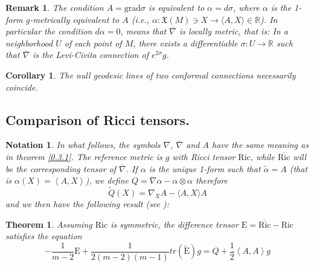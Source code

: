\documentclass{amsart}%
\newtheorem{theorem}{Theorem}
\theoremstyle{plain}
\newtheorem{corollary}{Corollary}
\newtheorem{notation}{Notation}
\newtheorem{remark}{Remark}
\numberwithin{equation}{section}
\begin{document}
\begin{remark}
\label{0.3.2}The condition $A=\mathrm{grad}\sigma$ is equivalent to
$\alpha=d\sigma$, where $\alpha$ is the 1-form $g$-metrically equivalent to
$A$ (i.e., $\alpha:\mathfrak{X}(M)\ni X\longrightarrow\langle A,X\rangle
\in\mathbb{R}$). In particular the condition $d\alpha=0$, means that
$\overline{\nabla}$ is locally metric, that is: In a neighborhood $U$ of each
point of $M$, there exists a differentiable $\sigma:U\longrightarrow
\mathbb{R}$ such that $\overline{\nabla}$ is the Levi-Civita connection of
$e^{2\sigma}g$.
\end{remark}

\begin{corollary}
The null geodesic lines of two conformal connections necessarily coincide.
\end{corollary}

\subsection{Comparison of Ricci tensors.}

\begin{notation}
\label{notacion}In what follows, the symbols $\nabla$, $\overline{\nabla}$ and
$A$ have the same meaning as in theorem \ref{0.3.1}. The reference metric is
$g$ with Ricci tensor $\mathrm{Ric}$, while $\overline{\mathrm{Ric}}$ will be
the corresponding tensor of $\overline{\nabla}$. If $\alpha$ is the unique
1-form such that $\widetilde{\alpha}=A$ (that is $\alpha\left(  X\right)
=\left\langle A,X\right\rangle $), we define $Q=\nabla\alpha-\alpha
\otimes\alpha$ therefore
\begin{equation}
\tilde{Q}(X)=\nabla_{X}A-\langle A,X\rangle A \label{Qtilde}%
\end{equation}
and we then have the following result (see \cite{Kul1}):
\end{notation}

\begin{theorem}
\label{0.5.1}Assuming $\overline{\mathrm{Ric}}$ is symmetric, the difference
tensor $\mathrm{E}=\overline{\mathrm{Ric}}-\mathrm{Ric}$ satisfies the
equation%
\begin{equation}
-\frac{1}{m-2}\mathrm{E}+\frac{1}{2\left(  m-2\right)  \left(  m-1\right)
}tr\left(  \widetilde{\mathrm{E}}\right)  g=Q+\frac{1}{2}\left\langle
A,A\right\rangle g \label{mainE}%
\end{equation}

\end{theorem}
\end{document}
